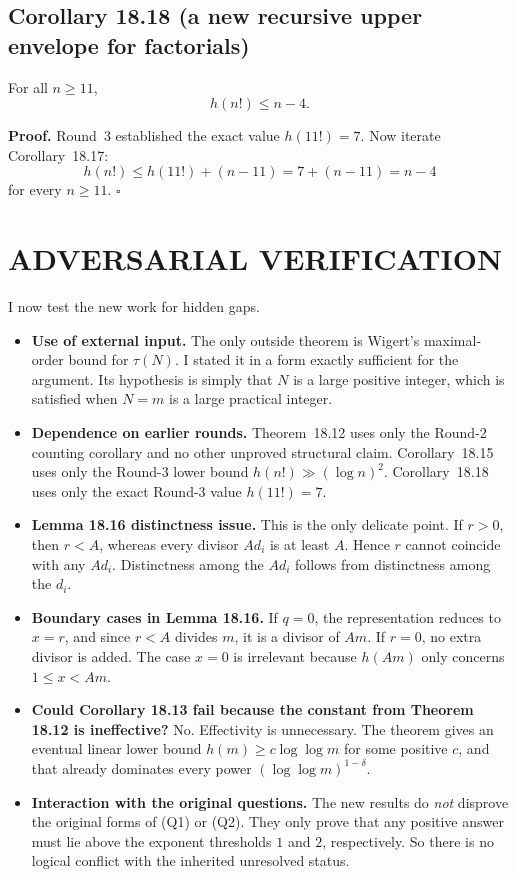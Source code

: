 \subsection*{Corollary 18.18 (a new recursive upper envelope for factorials)}

For all \(n\ge 11\),
\[
h(n!)\le n-4.
\]

\medskip

\noindent\textbf{Proof.}
Round~3 established the exact value \(h(11!)=7\). Now iterate Corollary~18.17:
\[
h(n!)\le h(11!)+(n-11)=7+(n-11)=n-4
\]
for every \(n\ge 11\).
\hfill\(\square\)

\section{ADVERSARIAL VERIFICATION}

I now test the new work for hidden gaps.

\begin{itemize}
\item \textbf{Use of external input.}
The only outside theorem is Wigert's maximal-order bound for \(\tau(N)\). I stated it in a form exactly sufficient for the argument. Its hypothesis is simply that \(N\) is a large positive integer, which is satisfied when \(N=m\) is a large practical integer.

\item \textbf{Dependence on earlier rounds.}
Theorem~18.12 uses only the Round-2 counting corollary and no other unproved structural claim. Corollary~18.15 uses only the Round-3 lower bound \(h(n!)\gg(\log n)^2\). Corollary~18.18 uses only the exact Round-3 value \(h(11!)=7\).

\item \textbf{Lemma 18.16 distinctness issue.}
This is the only delicate point. If \(r>0\), then \(r<A\), whereas every divisor \(Ad_i\) is at least \(A\). Hence \(r\) cannot coincide with any \(Ad_i\). Distinctness among the \(Ad_i\) follows from distinctness among the \(d_i\).

\item \textbf{Boundary cases in Lemma 18.16.}
If \(q=0\), the representation reduces to \(x=r\), and since \(r<A\) divides \(m\), it is a divisor of \(Am\). If \(r=0\), no extra divisor is added. The case \(x=0\) is irrelevant because \(h(Am)\) only concerns \(1\le x<Am\).

\item \textbf{Could Corollary 18.13 fail because the constant from Theorem 18.12 is ineffective?}
No. Effectivity is unnecessary. The theorem gives an eventual linear lower bound \(h(m)\ge c\log\log m\) for some positive \(c\), and that already dominates every power \((\log\log m)^{1-\delta}\).

\item \textbf{Interaction with the original questions.}
The new results do \emph{not} disprove the original forms of (Q1) or (Q2). They only prove that any positive answer must lie above the exponent thresholds \(1\) and \(2\), respectively. So there is no logical conflict with the inherited unresolved status.
\end{itemize}

